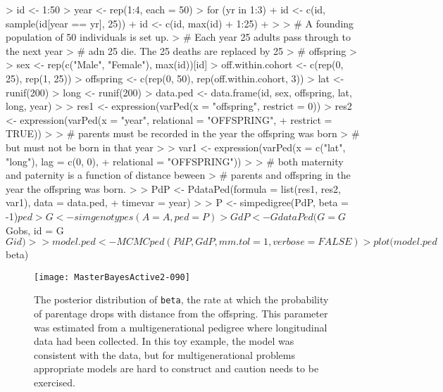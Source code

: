 \documentclass{article}
\begin{document}
\begin{Schunk}
\begin{Sinput}
> id <- 1:50
> year <- rep(1:4, each = 50)
> for (yr in 1:3) {
+     id <- c(id, sample(id[year == yr], 25))
+     id <- c(id, max(id) + 1:25)
+ }
> 
> # A founding population of 50 individuals is set up.
> # Each year 25 adults pass through to the next year
> # adn 25 die.  The 25 deaths are replaced by 25 
> # offspring
>
> sex <- rep(c("Male", "Female"), max(id))[id]
> off.within.cohort <- c(rep(0, 25), rep(1, 25))
> offspring <- c(rep(0, 50), rep(off.within.cohort, 3))
> lat <- runif(200)
> long <- runif(200)
> data.ped <- data.frame(id, sex, offspring, lat, long, year)
>
> res1 <- expression(varPed(x = "offspring", restrict = 0))
> res2 <- expression(varPed(x = "year", relational = "OFFSPRING", 
+     restrict = TRUE))
>
> # parents must be recorded in the year the offspring was born
> # but must not be born in that year
>
> var1 <- expression(varPed(x = c("lat", "long"), lag = c(0, 0), 
+     relational = "OFFSPRING"))
>
> # both maternity and paternity is a function of distance beween 
> # parents and offspring in the year the offspring was born.
>
> PdP <- PdataPed(formula = list(res1, res2, var1), data = data.ped, 
+     timevar = year)
>
> P <- simpedigree(PdP, beta = -1)$ped
> G <- simgenotypes(A = A, ped = P)
> GdP <- GdataPed(G = G$Gobs, id = G$Gid)
>
> model.ped <- MCMCped(PdP, GdP, mm.tol = 1, verbose = FALSE)
> plot(model.ped$beta)
\end{Sinput}
\end{Schunk}



\begin{figure}[!h]
\begin{center}
\texttt{[image: MasterBayesActive2-090]}
\end{center}
\caption{The posterior distribution of \texttt{beta}, the rate at which the probability of parentage drops with distance from the offspring.  This parameter was estimated from a multigenerational pedigree where longitudinal data had been collected.  In this toy example, the model was consistent with the data, but for multigenerational problems appropriate models are hard to construct and caution needs to be exercised.}
\label{MGped}
\end{figure}
\end{document}
